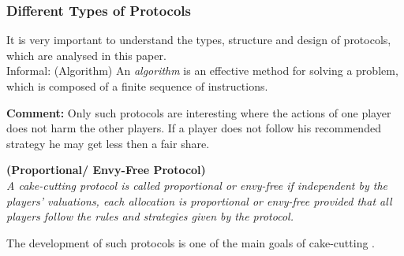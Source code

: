 \subsubsection{Different Types of Protocols}
It is very important to understand the types, structure and design of protocols, which are analysed in this paper.\\
\newline
Informal: (Algorithm)
\newline An \emph{algorithm} is an effective method for solving a problem, which is composed of a finite sequence of instructions.
\textbf{Comment:} Only such protocols are interesting where the actions of one player does not harm the other players. If a player does not follow his recommended strategy he may get less then a fair share.
\begin{defi}{\textbf{(Proportional/ Envy-Free Protocol)}}\\
\emph{A cake-cutting \emph{protocol} is called \emph{proportional} or \emph{envy-free} if independent by the players' valuations, each allocation is proportional or envy-free provided that all players follow the rules and strategies given by the protocol.}
\end{defi}
The development of such protocols is one of the main goals of cake-cutting \cite{bla}.

